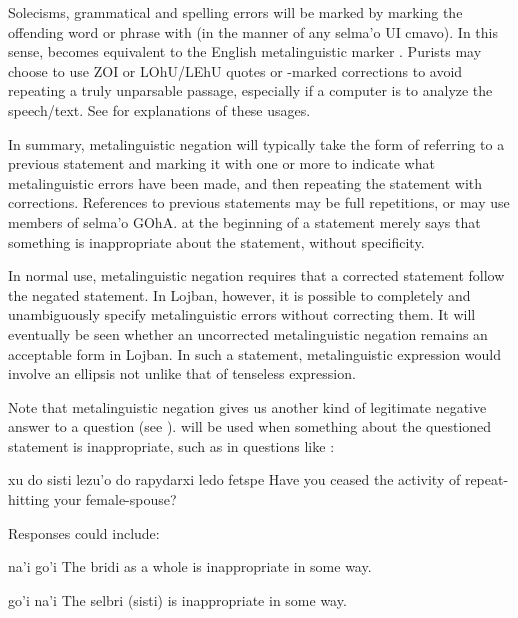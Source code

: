 Solecisms, grammatical and spelling errors will be marked by
    marking the offending word or phrase with  (in the
    manner of any selma'o UI cmavo). In this sense, 
    becomes equivalent to the English metalinguistic marker
    . Purists may choose to use ZOI or LOhU/LEhU quotes or
    -marked corrections to avoid repeating a truly
    unparsable passage, especially if a computer is to analyze the
    speech/text. See  for
    explanations of these usages.

In summary, metalinguistic negation will typically take the
    form of referring to a previous statement and marking it with
    one or more  to indicate what metalinguistic errors
    have been made, and then repeating the statement with
    corrections. References to previous statements may be full
    repetitions, or may use members of selma'o GOhA.  at
    the beginning of a statement merely says that something is
    inappropriate about the statement, without specificity.

In normal use, metalinguistic negation requires that a
    corrected statement follow the negated statement. In Lojban,
    however, it is possible to completely and unambiguously specify
    metalinguistic errors without correcting them. It will
    eventually be seen whether an uncorrected metalinguistic
    negation remains an acceptable form in Lojban. In such a
    statement, metalinguistic expression would involve an ellipsis
    not unlike that of tenseless expression.

Note that metalinguistic negation gives us another kind of
    legitimate negative answer to a  question (see ).  will be used when something
    about the questioned statement is inappropriate, such as in
    questions like :
\begin{example}
xu do sisti lezu'o do rapydarxi\n
\T	ledo fetspe\n
Have you ceased the activity of repeat-hitting\n
\T	your female-spouse?
\end{example}

Responses could include:
\begin{example}
na'i go'i\n
The bridi as a whole is inappropriate in some way.
\end{example}

\begin{example}
go'i na'i\n
The selbri (sisti) is inappropriate in some way.
\end{example}

